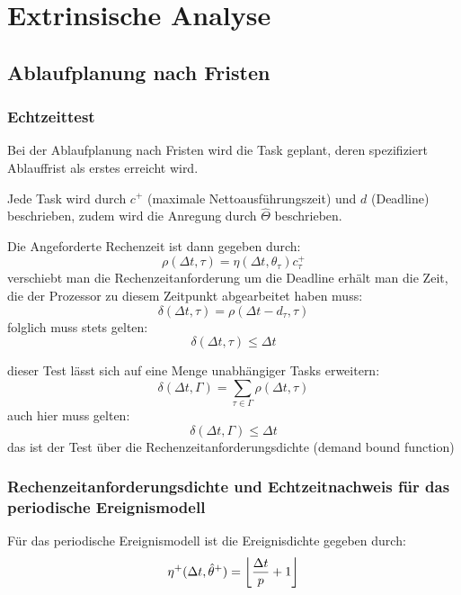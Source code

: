 \chapter{Extrinsische Analyse}
\section{Ablaufplanung nach Fristen}
\subsection{Echtzeittest}
Bei der Ablaufplanung nach Fristen wird die Task geplant, deren spezifiziert Ablauffrist
als erstes erreicht wird.

Jede Task wird durch $c^+$ (maximale Nettoausführungszeit) und $d$ (Deadline) beschrieben,
zudem wird die Anregung durch $\hat{\Theta}$ beschrieben.

Die Angeforderte Rechenzeit ist dann gegeben durch:
\begin{equation}
    \rho(\Delta t, \tau) = \eta(\Delta t, \theta_\tau) c^+_\tau
\end{equation}
verschiebt man die Rechenzeitanforderung um die Deadline erhält man die Zeit,
die der Prozessor zu diesem Zeitpunkt abgearbeitet haben muss:
\begin{equation}
    \delta(\Delta t, \tau) = \rho(\Delta t - d_\tau, \tau)
\end{equation}
folglich muss stets gelten:
\begin{equation}
    \delta(\Delta t, \tau) \leq \Delta t
\end{equation}

dieser Test lässt sich auf eine Menge unabhängiger Tasks erweitern:
\begin{equation}
    \delta(\Delta t, \Gamma) = \sum_{\tau \in \Gamma} \rho(\Delta t, \tau)
\end{equation}
auch hier muss gelten:
\begin{equation}
    \delta(\Delta t, \Gamma) \leq \Delta t
\end{equation}
das ist der Test über die Rechenzeitanforderungsdichte (demand bound function)

\subsection{Rechenzeitanforderungsdichte und Echtzeitnachweis für das periodische
Ereignismodell}
Für das periodische Ereignismodell ist die Ereignisdichte gegeben durch:
\begin{equation}
    \eta^+(\Delta t, \hat{\theta}^+) = \floor*{\frac{\Delta t}{p} + 1}
\end{equation}

